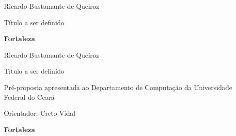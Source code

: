 \pagestyle{empty}

\begin{titlepage}


\begin{center}
{\LARGE Ricardo Bustamante de Queiroz}
\par
\vspace{200pt}
{\Huge Título a ser definido}
\par
\vfill
\textbf{{\large Fortaleza}\\
{\large \the\year}}
\end{center}
\end{titlepage}

\cleardoublepage

\pagestyle{fancy}



\thispagestyle{empty}

\begin{center}
{\LARGE Ricardo Bustamante de Queiroz}
\par
\vspace{200pt}
{\Huge Título a ser definido}
\end{center}
\par
\vspace{90pt}
\hspace*{175pt}\parbox{7.6cm}{{\large Pré-proposta apresentada ao Departamento de Computação da Universidade Federal do Ceará}}

\par
\vspace{1em}
\hspace*{175pt}\parbox{7.6cm}{{\large Orientador: Creto Vidal}}

\par
\vfill
\begin{center}
\textbf{{\large Fortaleza}\\
{\large \the\year}}
\end{center}

